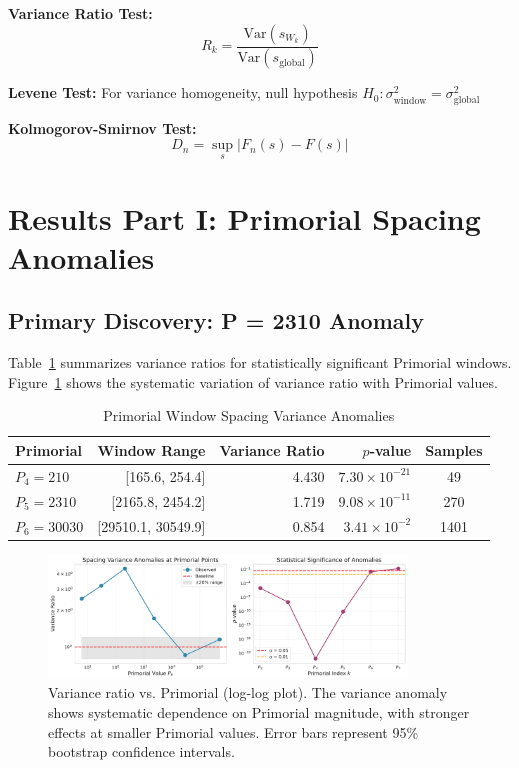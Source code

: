\documentclass[12pt]{article}
\begin{document}
\textbf{Variance Ratio Test:}
%
\begin{equation}
R_k = \frac{\text{Var}(s_{W_k})}{\text{Var}(s_{\text{global}})}
\end{equation}

\textbf{Levene Test:} For variance homogeneity, null hypothesis $H_0\colon \sigma^2_{\text{window}} = \sigma^2_{\text{global}}$

\textbf{Kolmogorov-Smirnov Test:}
%
\begin{equation}
D_n = \sup_s |F_n(s) - F(s)|
\end{equation}

\section{Results Part I: Primorial Spacing Anomalies}

\subsection{Primary Discovery: P = 2310 Anomaly}

Table~\ref{tab:primorial_variance} summarizes variance ratios for statistically significant Primorial windows. Figure~\ref{fig:s1} shows the systematic variation of variance ratio with Primorial values.

\begin{table}[htbp]
\centering
\caption{Primorial Window Spacing Variance Anomalies}
\label{tab:primorial_variance}
\small
\begin{tabular}{@{}lrrrc@{}}
\toprule
Primorial & Window Range & Variance Ratio & $p$-value & Samples \\
\midrule
$P_4 = 210$ & [165.6, 254.4] & 4.430 & $7.30 \times 10^{-21}$ & 49 \\
$P_5 = 2310$ & [2165.8, 2454.2] & 1.719 & $9.08 \times 10^{-11}$ & 270 \\
$P_6 = 30030$ & [29510.1, 30549.9] & 0.854 & $3.41 \times 10^{-2}$ & 1401 \\
\bottomrule
\end{tabular}
\end{table}

\begin{figure}[htbp]
\centering
\includegraphics[width=0.85\textwidth]{fig_s1_variance_ratio_vs_primorial.pdf}
\caption{Variance ratio vs. Primorial (log-log plot). The variance anomaly shows systematic dependence on Primorial magnitude, with stronger effects at smaller Primorial values. Error bars represent 95\% bootstrap confidence intervals.}
\label{fig:s1}
\end{figure}
\end{document}
